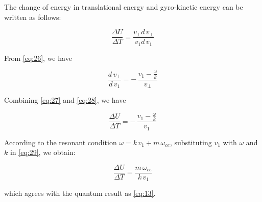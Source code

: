 \documentclass{cpbtex3}
\begin{document}
The change of energy in translational energy and gyro-kinetic energy can be written as follows:

\begin{equation}
\frac{\Delta U}{\Delta T}=\frac{v_{\perp}d\,v_{\perp}}{v_{1}d\,v_{1}}
\label{eq:27}
\end{equation}

From \eqref{eq:26}, we have

\begin{equation}
\frac{d\,v_{\perp}}{d\,v_{1}}=-\,\frac{v_{1}-\frac{\omega}{k}}{v_{\perp}}
\label{eq:28}
\end{equation}

Combining \eqref{eq:27} and \eqref{eq:28}, we have

\begin{equation}
\frac{\Delta U}{\Delta T}=-\,\frac{v_{1}-\frac{\omega}{k}}{v_{1}}
\label{eq:29}
\end{equation}

According to the resonant condition $\omega=k\,v_{1}+m\,\omega_{ce}$, substituting $v_{1}$ with $\omega$ and $k$ in \eqref{eq:29}, we obtain:

\begin{equation}
\frac{\Delta U}{\Delta T}=\frac{m\,\omega_{ce}}{k\,v_{1}}
\label{eq:30}
\end{equation}

which agrees with the quantum result as \eqref{eq:13}.






\end{document}
